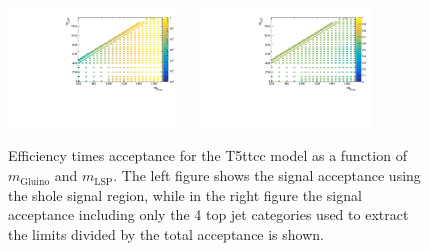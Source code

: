 \begin{figure}[h!]
  \begin{center}
    \includegraphics[width=0.4\textwidth]{figures/jetRanking/T5ttcc/eff/T5ttcc_merging_9_cats.pdf} ~~
    \includegraphics[width=0.4\textwidth]{figures/susyResults/T5ttcc_doubleRatioAcceptance.pdf} \\
    \caption{
      Efficiency times acceptance for the T5ttcc model as a function of $m_{\mathrm{Gluino}}$ and $m_{\mathrm{LSP}}$.
      The left figure shows the signal acceptance using the shole signal region, 
      while in the right figure the signal acceptance including only the 4 top jet categories used to extract the limits divided by the total acceptance is shown.
    }
    \label{fig:sig-eff-T5ttcc}
  \end{center}
\end{figure}

